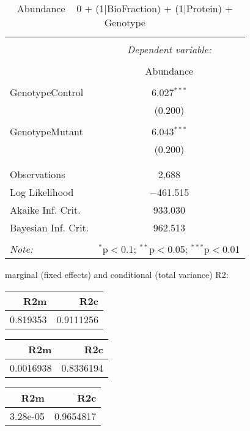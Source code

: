 \documentclass[11pt]{report}
\begin{document}
\begin{table}[!htbp] \centering 
  \caption{Abundance ~ 0 + (1|BioFraction) + (1|Protein) + Genotype} 
  \label{} 
\begin{tabular}{@{\extracolsep{5pt}}lc} 
\\[-1.8ex]\hline 
\hline \\[-1.8ex] 
 & \multicolumn{1}{c}{\textit{Dependent variable:}} \\ 
\cline{2-2} 
\\[-1.8ex] & Abundance \\ 
\hline \\[-1.8ex] 
 GenotypeControl & 6.027$^{***}$ \\ 
  & (0.200) \\ 
  & \\ 
 GenotypeMutant & 6.043$^{***}$ \\ 
  & (0.200) \\ 
  & \\ 
\hline \\[-1.8ex] 
Observations & 2,688 \\ 
Log Likelihood & $-$461.515 \\ 
Akaike Inf. Crit. & 933.030 \\ 
Bayesian Inf. Crit. & 962.513 \\ 
\hline 
\hline \\[-1.8ex] 
\textit{Note:}  & \multicolumn{1}{r}{$^{*}$p$<$0.1; $^{**}$p$<$0.05; $^{***}$p$<$0.01} \\ 
\end{tabular} 
\end{table} 
marginal (fixed effects) and conditional (total variance) R2:

\begin{tabular}{r|r}
\hline
R2m & R2c\\
\hline
0.819353 & 0.9111256\\
\hline
\end{tabular}

\begin{tabular}{r|r}
\hline
R2m & R2c\\
\hline
0.0016938 & 0.8336194\\
\hline
\end{tabular}

\begin{tabular}{r|r}
\hline
R2m & R2c\\
\hline
3.28e-05 & 0.9654817\\
\hline
\end{tabular}
\end{document}
